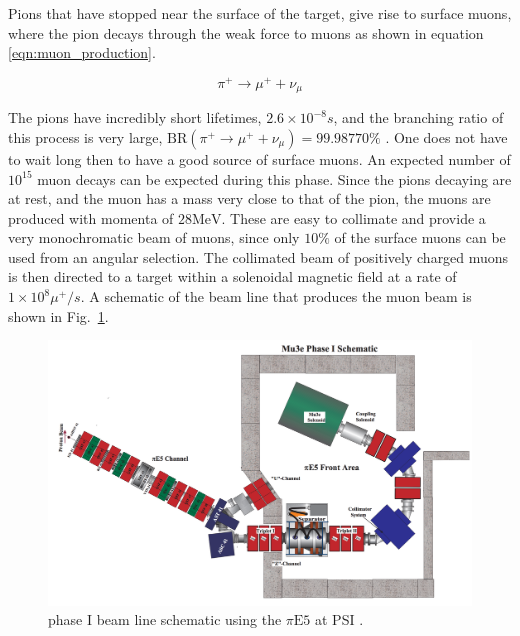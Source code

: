 Pions that have stopped near the surface of the target, give rise to surface muons, where the pion decays through the weak force to muons as shown in equation \ref{eqn:muon_production}.

\begin{equation}
\label{eqn:muon_production}
\pi^+ \rightarrow \mu^+ + \nu_\mu
\end{equation}

\noindent The pions have incredibly short lifetimes, $2.6 \times 10^{-8}s$, and the branching ratio of this process is very large, $\textrm{BR}(\pi^+ \rightarrow \mu^+ + \nu_\mu) = 99.98770\%$ \cite{Agashe:2014kda}.
One does not have to wait long then to have a good source of surface muons.
An expected number of $10^{15}$ muon decays can be expected during this phase.
Since the pions decaying are at rest, and the muon has a mass very close to that of the pion, the muons are produced with momenta of $28\textrm{MeV}$.
These are easy to collimate and provide a very monochromatic beam of muons, since only $10\%$ of the surface muons can be used from an angular selection.
The collimated beam of positively charged muons is then directed to a target within a solenoidal magnetic field at a rate of $1 \times 10^8 \mu^+/s$.
A schematic of the beam line that produces the muon beam is shown in Fig.\ \ref{fig:mu3e_phaseI_schematic}.

\begin{figure}[h]
    \centering
    \includegraphics[width = \textwidth]{Figures/experiments/mu3e_phase1_schematic.png}
    \caption{\mueee phase I beam line schematic using the $\pi\textrm{E5}$ at PSI \cite{Blondel:2013ia}.}
    \label{fig:mu3e_phaseI_schematic}
\end{figure}

